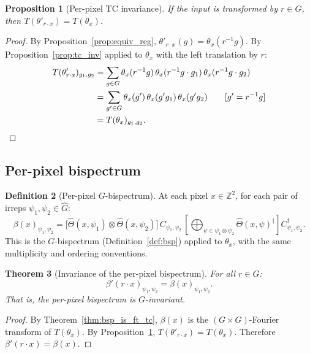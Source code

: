 \documentclass{article}
\newtheorem{theorem}{Theorem}[section]
\newtheorem{proposition}[theorem]{Proposition}
\theoremstyle{definition}
\newtheorem{definition}[theorem]{Definition}
\theoremstyle{remark}
\newcommand{\Z}{\mathbb{Z}}
\newcommand{\Ghat}{\widehat{G}}
\begin{document}
\begin{proposition}[Per-pixel TC invariance]\label{prop:perpixel_tc_inv}
If the input is transformed by $r \in G$, then $T(\theta'_{r \cdot x}) = T(\theta_x)$.
\end{proposition}
\begin{proof}
By Proposition~\ref{prop:equiv_reg}, $\theta'_{r \cdot x}(g) = \theta_x(r^{-1}g)$. By Proposition~\ref{prop:tc_inv} applied to $\theta_x$ with the left translation by $r$:
\begin{align*}
T(\theta'_{r \cdot x})_{g_1, g_2}
&= \sum_{g \in G} \theta_x(r^{-1}g)\, \theta_x(r^{-1}g \cdot g_1)\, \theta_x(r^{-1}g \cdot g_2) \\
&= \sum_{g' \in G} \theta_x(g')\, \theta_x(g' g_1)\, \theta_x(g' g_2) \qquad [g' = r^{-1}g]\\
&= T(\theta_x)_{g_1, g_2}. \qedhere
\end{align*}
\end{proof}

\subsection{Per-pixel bispectrum}

\begin{definition}[Per-pixel $G$-bispectrum]\label{def:perpixel_bsp}
At each pixel $x \in \Z^2$, for each pair of irreps $\psi_1, \psi_2 \in \Ghat$:
\begin{equation}\label{eq:perpixel_bsp}
\beta(x)_{\psi_1, \psi_2}
= \bigl[\widehat{\Theta}(x,\psi_1) \otimes \widehat{\Theta}(x,\psi_2)\bigr]\,
C_{\psi_1,\psi_2}\,
\left[\bigoplus_{\psi \in \psi_1 \otimes \psi_2} \widehat{\Theta}(x,\psi)^\dagger\right]
C_{\psi_1,\psi_2}^\dagger.
\end{equation}
This is the $G$-bispectrum (Definition~\ref{def:bsp}) applied to $\theta_x$, with the same multiplicity and ordering conventions.
\end{definition}

\begin{theorem}[Invariance of the per-pixel bispectrum]\label{thm:perpixel_bsp_inv}
For all $r \in G$:
\begin{equation}
\beta'(r \cdot x)_{\psi_1, \psi_2} = \beta(x)_{\psi_1, \psi_2}.
\end{equation}
That is, the per-pixel bispectrum is $G$-invariant.
\end{theorem}
\begin{proof}
By Theorem~\ref{thm:bsp_is_ft_tc}, $\beta(x)$ is the $(G \times G)$-Fourier transform of $T(\theta_x)$. By Proposition~\ref{prop:perpixel_tc_inv}, $T(\theta'_{r \cdot x}) = T(\theta_x)$. Therefore $\beta'(r \cdot x) = \beta(x)$.
\end{proof}
\end{document}
